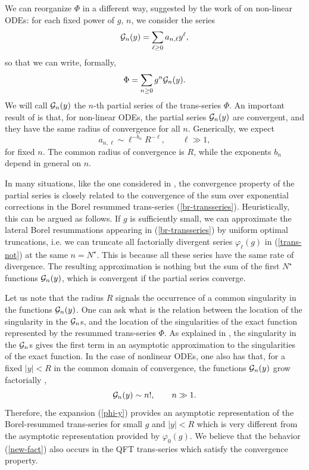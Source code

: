 \documentclass[a4paper,11pt]{article}
\theoremstyle{definition}
\newcommand{\CG}{{\cal G}}
\newcommand{\be}{\begin{equation}}
\newcommand{\ee}{\end{equation}}
\begin{document}
We can reorganize $\Phi$ in a different way, suggested by the work of 
\cite{costin-costin} on non-linear ODEs: for each fixed power of $g$, $n$, we consider the series 
%
\be
\label{CGdef}
\CG_n(y)= \sum_{\ell \ge 0} a_{n, \ell} y^\ell,
\ee
%
so that we can write, formally, 
%
\be
\label{phi-y}
\Phi= \sum_{n \ge 0} g^n \CG_n (y).
\ee
%
We will call $\CG_n(y)$ the $n$-th partial series of the trans-series $\Phi$. 
An important result of \cite{costin-costin} is that, for non-linear ODEs, the partial series $\CG_n(y)$ are convergent, and 
they have the same radius of convergence for all $n$. Generically, we expect
%
\be
a_{n, \ell} \sim \ell^{-b_n} R^{-\ell}, \qquad \ell \gg 1,
\label{an-bn-R}
\ee
%
for fixed $n$. The common radius of convergence is $R$, while the exponents $b_n$ depend in general on $n$. 

In many situations, like the one considered in \cite{costin-costin}, 
the convergence property of the partial series is closely 
related to the convergence of the sum over exponential corrections in the Borel resummed trans-series (\ref{br-transseries}). 
Heuristically, this can be argued as follows. If $g$ is sufficiently small, we can 
approximate the lateral Borel resummations appearing in (\ref{br-transseries}) 
by uniform optimal truncations, i.e. we can truncate all factorially divergent series 
$\varphi_\ell(g)$ in (\ref{trans-not}) at the same $n=N^\star$. 
This is because all these series have the same rate of divergence. The 
resulting approximation is nothing but the sum of the first $N^\star$ functions $\CG_n(y)$, which is convergent if the 
partial series converge. 
 
Let us note that the radius $R$ signals the occurrence of a common singularity in the functions $\CG_n(y)$. One can 
ask what is the relation between the location of the singularity in the $\CG_n$s, and the location of the singularities of the 
exact function represented by the resummed trans-series $\Phi$. As explained in \cite{costin-costin}, the singularity in the $\CG_n$s gives the first term in an asymptotic approximation to the singularities of the exact function. In the case of nonlinear ODEs, one also 
has that, for a fixed $|y|<R$ in the common domain of convergence, the functions $\CG_n(y)$ grow 
factorially \cite{costin-costin}, 
%
\be
\label{new-fact}
\CG_n(y) \sim n!, \qquad n\gg 1. 
\ee
%
Therefore, the expansion (\ref{phi-y}) provides an asymptotic representation of the 
Borel-resummed trans-series for small $g$ and $|y|<R$ which is very different from the asymptotic representation 
provided by $\varphi_0(g)$. We believe that the behavior (\ref{new-fact}) also occurs in the QFT trans-series which satisfy the 
convergence property. 
\end{document}
